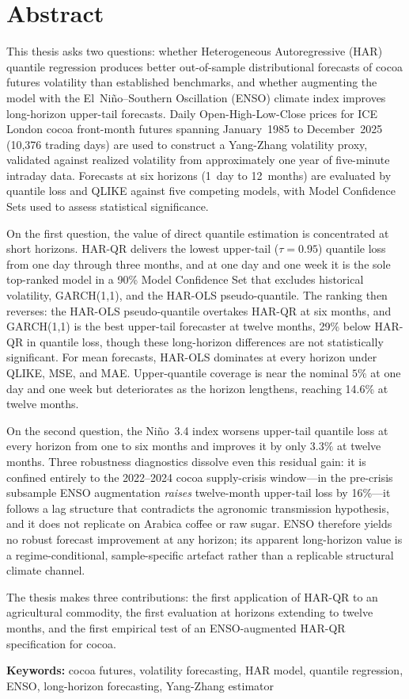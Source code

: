 \section*{Abstract}

This thesis asks two questions: whether Heterogeneous Autoregressive (HAR) quantile regression produces better out-of-sample distributional forecasts of cocoa futures volatility than established benchmarks, and whether augmenting the model with the El~Ni\~no--Southern Oscillation (ENSO) climate index improves long-horizon upper-tail forecasts. Daily Open-High-Low-Close prices for ICE London cocoa front-month futures spanning January~1985 to December~2025 (10,376 trading days) are used to construct a Yang-Zhang volatility proxy, validated against realized volatility from approximately one year of five-minute intraday data. Forecasts at six horizons (1~day to 12~months) are evaluated by quantile loss and QLIKE against five competing models, with Model Confidence Sets used to assess statistical significance.

On the first question, the value of direct quantile estimation is concentrated at short horizons. HAR-QR delivers the lowest upper-tail ($\tau = 0.95$) quantile loss from one day through three months, and at one day and one week it is the sole top-ranked model in a 90\% Model Confidence Set that excludes historical volatility, GARCH(1,1), and the HAR-OLS pseudo-quantile. The ranking then reverses: the HAR-OLS pseudo-quantile overtakes HAR-QR at six months, and GARCH(1,1) is the best upper-tail forecaster at twelve months, 29\% below HAR-QR in quantile loss, though these long-horizon differences are not statistically significant. For mean forecasts, HAR-OLS dominates at every horizon under QLIKE, MSE, and MAE. Upper-quantile coverage is near the nominal $5\%$ at one day and one week but deteriorates as the horizon lengthens, reaching 14.6\% at twelve months.

On the second question, the Ni\~no~3.4 index worsens upper-tail quantile loss at every horizon from one to six months and improves it by only $3.3\%$ at twelve months. Three robustness diagnostics dissolve even this residual gain: it is confined entirely to the 2022--2024 cocoa supply-crisis window---in the pre-crisis subsample ENSO augmentation \emph{raises} twelve-month upper-tail loss by 16\%---it follows a lag structure that contradicts the agronomic transmission hypothesis, and it does not replicate on Arabica coffee or raw sugar. ENSO therefore yields no robust forecast improvement at any horizon; its apparent long-horizon value is a regime-conditional, sample-specific artefact rather than a replicable structural climate channel.

The thesis makes three contributions: the first application of HAR-QR to an agricultural commodity, the first evaluation at horizons extending to twelve months, and the first empirical test of an ENSO-augmented HAR-QR specification for cocoa.

\vspace{0.5cm}
\noindent\textbf{Keywords:} cocoa futures, volatility forecasting, HAR model, quantile regression, ENSO, long-horizon forecasting, Yang-Zhang estimator
